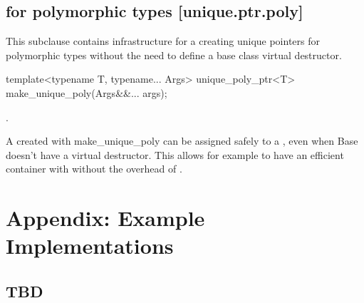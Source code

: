 \documentclass[ebook,11pt,article]{memoir}
\begin{document}
\section{ for polymorphic types [unique.ptr.poly]}
\pnum
This subclause contains infrastructure for a creating unique pointers for polymorphic types without the need to define a base class virtual destructor.\\

\begin{itemdecl}
template<typename T, typename... Args>
unique_poly_ptr<T> make_unique_poly(Args&&... args);

\end{itemdecl}

\pnum
\returns {}.

\pnum
\enternote
A  created with make_unique_poly can be assigned safely to a , even when Base doesn't have a virtual destructor. This allows for example to have an efficient container with  without the overhead of .
\exitnote


\chapter{Appendix: Example Implementations}
\section{TBD}
\begin{codeblock}
\end{codeblock}
\end{document}
